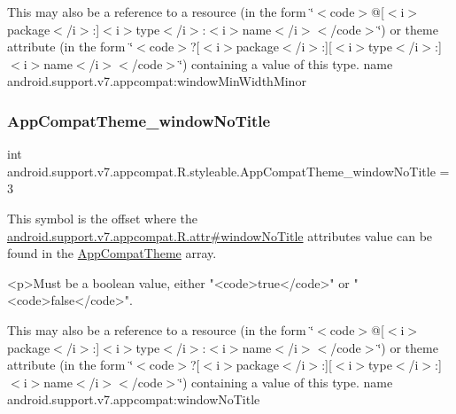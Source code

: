This may also be a reference to a resource (in the form \char`\"{}$<$code$>$@\mbox{[}$<$i$>$package$<$/i$>$\+:\mbox{]}$<$i$>$type$<$/i$>$\+:$<$i$>$name$<$/i$>$$<$/code$>$\char`\"{}) or theme attribute (in the form \char`\"{}$<$code$>$?\mbox{[}$<$i$>$package$<$/i$>$\+:\mbox{]}\mbox{[}$<$i$>$type$<$/i$>$\+:\mbox{]}$<$i$>$name$<$/i$>$$<$/code$>$\char`\"{}) containing a value of this type.  name android.\+support.\+v7.\+appcompat\+:window\+Min\+Width\+Minor \mbox{\label{classandroid_1_1support_1_1v7_1_1appcompat_1_1R_1_1styleable_a3d6aa74951e0bed5e26ea58ec3e818f6}} 
\subsubsection{\texorpdfstring{App\+Compat\+Theme\+\_\+window\+No\+Title}{AppCompatTheme\_windowNoTitle}}
{\footnotesize\ttfamily int android.\+support.\+v7.\+appcompat.\+R.\+styleable.\+App\+Compat\+Theme\+\_\+window\+No\+Title = 3\hspace{0.3cm}{\ttfamily [static]}}

This symbol is the offset where the \hyperlink{classandroid_1_1support_1_1v7_1_1appcompat_1_1R_1_1attr_a9f5fa98788f7d689538690d3e654a5a8}{android.\+support.\+v7.\+appcompat.\+R.\+attr\#window\+No\+Title} attribute\textquotesingle{}s value can be found in the \hyperlink{classandroid_1_1support_1_1v7_1_1appcompat_1_1R_1_1styleable_a5c42f89e8a410c323be34208d75c430b}{App\+Compat\+Theme} array.

\begin{DoxyVerb}      <p>Must be a boolean value, either "<code>true</code>" or "<code>false</code>".
\end{DoxyVerb}
 

This may also be a reference to a resource (in the form \char`\"{}$<$code$>$@\mbox{[}$<$i$>$package$<$/i$>$\+:\mbox{]}$<$i$>$type$<$/i$>$\+:$<$i$>$name$<$/i$>$$<$/code$>$\char`\"{}) or theme attribute (in the form \char`\"{}$<$code$>$?\mbox{[}$<$i$>$package$<$/i$>$\+:\mbox{]}\mbox{[}$<$i$>$type$<$/i$>$\+:\mbox{]}$<$i$>$name$<$/i$>$$<$/code$>$\char`\"{}) containing a value of this type.  name android.\+support.\+v7.\+appcompat\+:window\+No\+Title \mbox{\label{classandroid_1_1support_1_1v7_1_1appcompat_1_1R_1_1styleable_aed00e7319fe5debc6a1621afa2ca6bb5}} 
